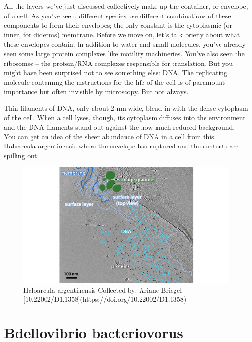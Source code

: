 \documentclass[]{tufte-book}
\begin{document}
All the layers we've just discussed collectively make up the container,
or envelope, of a cell. As you've seen, different species use different
combinations of these components to form their envelopes; the only
constant is the cytoplasmic (or inner, for diderms) membrane. Before we
move on, let's talk briefly about what these envelopes contain. In
addition to water and small molecules, you've already seen some large
protein complexes like motility machineries. You've also seen the
ribosomes -- the protein/RNA complexes responsible for translation. But
you might have been surprised not to see something else: DNA. The
replicating molecule containing the instructions for the life of the
cell is of paramount importance but often invisible by microscopy. But
not always.

Thin filaments of DNA, only about 2 nm wide, blend in with the dense
cytoplasm of the cell. When a cell lyses, though, its cytoplasm diffuses
into the environment and the DNA filaments stand out against the
now-much-reduced background. You can get an idea of the sheer abundance
of DNA in a cell from this Haloarcula argentinensis where the envelope
has ruptured and the contents are spilling out.

\begin{figure}
\includegraphics{img/2_9_Hargentinensis} \caption[Haloarcula argentinensis Collected by]{Haloarcula argentinensis Collected by: Ariane Briegel [10.22002/D1.1358](https://doi.org/10.22002/D1.1358)}\label{fig:unnamed-chunk-25}
\end{figure}

\section{Bdellovibrio bacteriovorus}\label{bdellovibrio-bacteriovorus}
\end{document}
